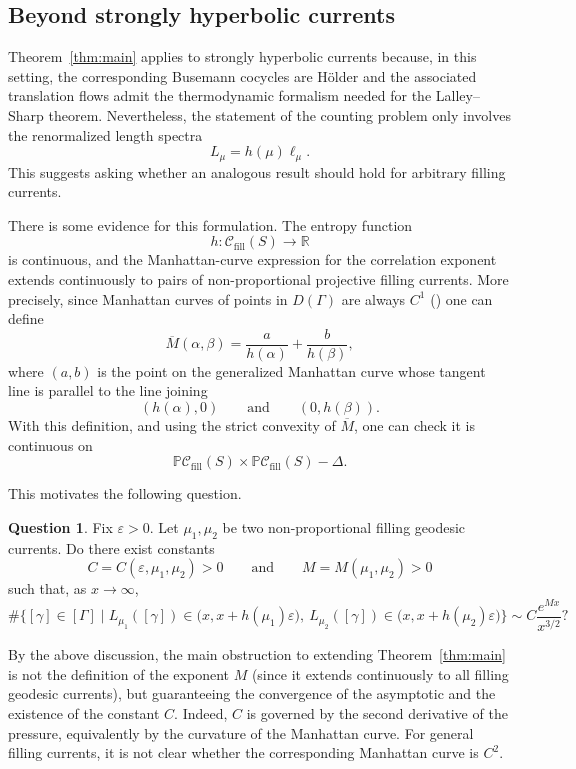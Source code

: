 \documentclass[12pt]{amsart}
\numberwithin{equation}{section}
\numberwithin{figure}{section}
\theoremstyle{definition}
\newtheorem{question}[equation]{Question}
\theoremstyle{plain}
\begin{document}
\subsection{Beyond strongly hyperbolic currents}

Theorem~\ref{thm:main} applies to strongly hyperbolic currents because, in this setting, the corresponding Busemann cocycles are H\"older and the associated translation flows admit the thermodynamic formalism needed for the Lalley--Sharp theorem. Nevertheless, the statement of the counting problem only involves the renormalized length spectra
\[
L_\mu=h(\mu)\ell_\mu.
\]
This suggests asking whether an analogous result should hold for arbitrary filling currents.

There is some evidence for this formulation. The entropy function
\[
h:\mathcal C_{\mathrm{fill}}(S)\to\mathbb R
\]
is continuous, and the Manhattan-curve expression for the correlation exponent extends continuously to pairs of non-proportional projective filling currents. More precisely, since Manhattan curves of points in $D(\Gamma)$ are always $C^1$ (\cite[Theorem~1.1]{CT25:Manhattan}) one can define
\[
\overline M(\alpha,\beta)
=
\frac{a}{h(\alpha)}+\frac{b}{h(\beta)},
\]
where $(a,b)$ is the point on the generalized Manhattan curve whose tangent line is parallel to the line joining
\[
(h(\alpha),0)
\qquad\text{and}\qquad
(0,h(\beta)).
\]
With this definition, and using the strict convexity of $\overline M$, one can check it is continuous on
\[
\mathbb P\mathcal C_{\mathrm{fill}}(S)\times
\mathbb P\mathcal C_{\mathrm{fill}}(S)-\Delta.
\]

This motivates the following question.

\begin{question}
\label{thm:FillingMain}
Fix $\varepsilon>0$. Let $\mu_1,\mu_2$ be two non-proportional filling geodesic currents. Do there exist constants
\[
C=C(\varepsilon,\mu_1,\mu_2)>0
\qquad\text{and}\qquad
M=M(\mu_1,\mu_2)>0
\]
such that, as $x\to\infty$,
\[
\#\Big\{[\gamma]\in[\Gamma]\;\Big|\;
L_{\mu_1}([\gamma])\in \bigl(x,x+h(\mu_1)\varepsilon\bigr),\ 
L_{\mu_2}([\gamma])\in \bigl(x,x+h(\mu_2)\varepsilon\bigr)
\Big\}
\sim
C\frac{e^{Mx}}{x^{3/2}}?
\]
\end{question}

By the above discussion, the main obstruction to extending Theorem~\ref{thm:main} is not the definition of the exponent $M$ (since it extends continuously to all filling geodesic currents), but guaranteeing the convergence of the asymptotic and the existence of the constant $C$. Indeed, $C$ is governed by the second derivative of the pressure, equivalently by the curvature of the Manhattan curve. For general filling currents, it is not clear whether the corresponding Manhattan curve is $C^2$.
\end{document}
